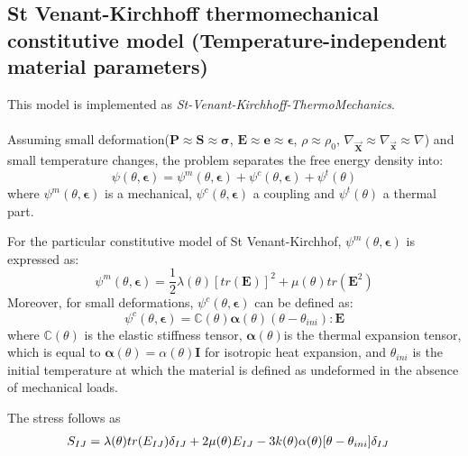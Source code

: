 \documentclass[oneside,11pt,times]{book}
\begin{document}
\subsection{St Venant-Kirchhoff thermomechanical constitutive model (Temperature-independent material parameters)}
This model is implemented as \textit{St-Venant-Kirchhoff-ThermoMechanics}.
\\ \\
Assuming small deformation($\boldsymbol{P}\approx\boldsymbol{S}\approx\boldsymbol{\sigma}$, $\boldsymbol{E}\approx\boldsymbol{e}\approx\boldsymbol{\epsilon}$, $\rho\approx\rho_0$, $\nabla_{\vec{\boldsymbol{X}}}\approx\nabla_{\vec{\boldsymbol{x}}}\approx\nabla$) and small temperature changes, the problem separates the free energy density into:
\begin{equation}
  \psi (\theta, \boldsymbol{\epsilon}) = \psi^{m} (\theta, \boldsymbol{\epsilon})+\psi^{c}(\theta, \boldsymbol{\epsilon})+\psi^{t}(\theta)
\end{equation}
where $\psi^{m} (\theta, \boldsymbol{\epsilon})$ is a mechanical, $\psi^{c}(\theta, \boldsymbol{\epsilon})$ a coupling and $\psi^{t}(\theta)$ a thermal part.

For the particular constitutive model of St Venant-Kirchhof, $\psi^{m} (\theta, \boldsymbol{\epsilon})$ is expressed as:
\begin{equation}
\psi^{m} (\theta, \boldsymbol{\epsilon})=\frac{1}{2}\lambda(\theta)\left[tr(\boldsymbol{E})\right]^2+\mu(\theta)tr(\boldsymbol{E}^2)
\end{equation}
Moreover, for small deformations, $\psi^{c} (\theta, \boldsymbol{\epsilon})$ can be defined as:
\begin{equation}
\psi^{c} (\theta, \boldsymbol{\epsilon})=\mathbb{C}(\theta)\boldsymbol{\alpha}(\theta)\left(\theta-\theta_{ini}\right):\boldsymbol{E}
\end{equation}
where $\mathbb{C}(\theta)$ is the elastic stiffness tensor, $\boldsymbol{\alpha}(\theta)$is the thermal expansion tensor, which is equal to $\boldsymbol{\alpha}(\theta)=\alpha(\theta)\boldsymbol{I}$ for isotropic heat expansion, and $\theta_{ini}$ is the initial temperature at which the material is defined as undeformed in the absence of mechanical loads.

The stress follows as
\begin{equation}
\begin{aligned}
\centering
S_{IJ} &=\lambda (\theta) tr(E_{IJ})\delta_{IJ} +2\mu (\theta) E_{IJ}-3k(\theta)\alpha(\theta)[\theta-\theta_{ini}]\delta_{IJ}
\end{aligned}
\label{stress}
\end{equation}
\end{document}
